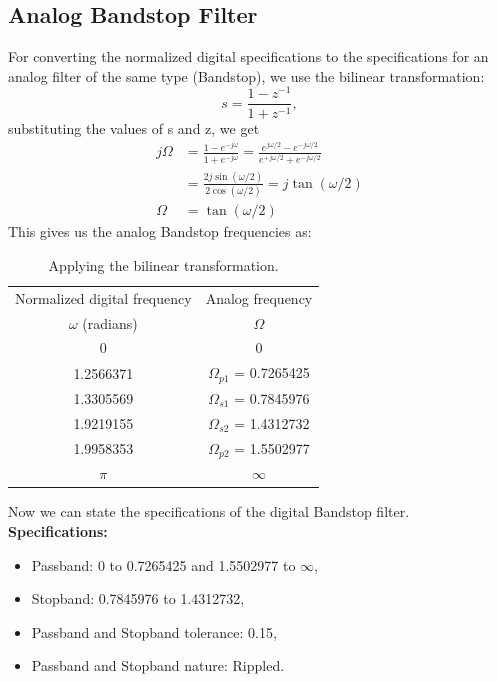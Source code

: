 \documentclass[12pt]{article}
\begin{document}
\subsection{Analog Bandstop Filter}
For converting the normalized digital specifications to the specifications for an analog filter of the same type (Bandstop), we use the bilinear transformation:
\[s = \frac{1-z^{-1}}{1+z^{-1}},\]
substituting the values of s and z, we get
\begin{align*}
    j\Omega &= \frac{1-e^{-j\omega}}{1+e^{-j\omega}} = \frac{e^{j\omega/2}-e^{-j\omega/2}}{e^{+j\omega/2}+e^{-j\omega/2}}\\
    &= \frac{2j\sin(\omega/2)}{2\cos(\omega/2)} = j\tan(\omega/2)\\
    \Omega &= \tan(\omega/2)
\end{align*}
This gives us the analog Bandstop frequencies as:
\begin{table}[h]
    \centering
    \begin{tabular}{|c|c|}\hline
         Normalized digital frequency&Analog frequency\\
         $\omega$ (radians)&$\Omega$\\\hline
         0&0\\\hline
         1.2566371&$\Omega_{p1}$ = 0.7265425\\\hline
         1.3305569&$\Omega_{s1}$ = 0.7845976\\\hline
         1.9219155&$\Omega_{s2}$ = 1.4312732\\\hline
         1.9958353&$\Omega_{p2}$ = 1.5502977\\\hline
         $\pi$&$\infty$\\\hline
    \end{tabular}
    \caption{Applying the bilinear transformation.}
    \label{tab:2}
\end{table}

Now we can state the specifications of the digital Bandstop filter.
\newline
\hline
\vspace{10pt}
\textbf{Specifications:}
\begin{itemize}
    \item Passband: 0 to 0.7265425 and 1.5502977 to $\infty$,
    \item Stopband: 0.7845976 to 1.4312732,
    \item Passband and Stopband tolerance: 0.15,
    \item Passband and Stopband nature: Rippled.
\end{itemize}
\hline
\end{document}
